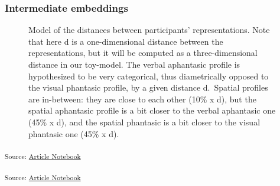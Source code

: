 \documentclass[
  authoryear]{elsarticle}
\begin{document}
\subsubsection{Intermediate embeddings}\label{intermediate-embeddings}

\begin{figure}


\caption{\label{fig-diagram-intermediate}Model of the distances between
participants' representations. Note that here d is a one-dimensional
distance between the representations, but it will be computed as a
three-dimensional distance in our toy-model. The verbal aphantasic
profile is hypothesized to be very categorical, thus diametrically
opposed to the visual phantasic profile, by a given distance d.~Spatial
profiles are in-between: they are close to each other (10\% x d), but
the spatial aphantasic profile is a bit closer to the verbal aphantasic
one (45\% x d), and the spatial phantasic is a bit closer to the visual
phantasic one (45\% x d).}

\end{figure}%

\textsubscript{Source:
\href{https://m-delem.github.io/2499-similarity-manuscript/index.qmd.html}{Article
Notebook}}

\textsubscript{Source:
\href{https://m-delem.github.io/2499-similarity-manuscript/index.qmd.html}{Article
Notebook}}
\end{document}
